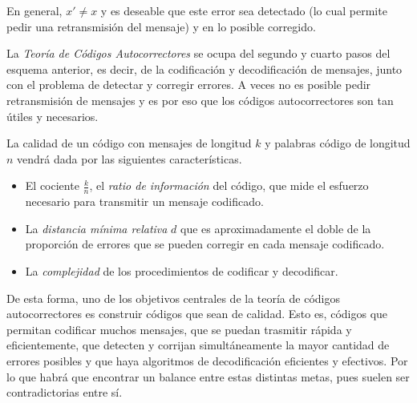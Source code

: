 En general, $x' \neq x$ y es deseable que este error sea detectado (lo cual permite pedir una retransmisión del mensaje) y en lo posible corregido.

La \emph{Teoría de Códigos Autocorrectores} se ocupa del segundo y cuarto pasos del esquema anterior, es decir, de la codificación y decodificación de mensajes, junto con el problema de detectar y corregir errores. A veces no es posible pedir retransmisión de mensajes y es por eso que los códigos autocorrectores son tan útiles y necesarios.

La calidad de un código con mensajes de longitud $k$ y palabras código de longitud $n$ vendrá dada por las siguientes características.

\begin{itemize}
    \item El cociente $\frac{k}{n}$, el \emph{ratio de información} del código, que mide el esfuerzo necesario para transmitir un mensaje codificado.
    \item La \emph{distancia mínima relativa} $d$ que es aproximadamente el doble de la proporción de errores que se pueden corregir en cada mensaje codificado.
    \item La \emph{complejidad} de los procedimientos de codificar y decodificar.
\end{itemize}

De esta forma, uno de los objetivos centrales de la teoría de códigos autocorrectores es construir códigos que sean de calidad. Esto es, códigos que permitan codificar muchos mensajes, que se puedan trasmitir rápida y eficientemente, que detecten y corrijan simultáneamente la mayor cantidad de errores posibles y que haya algoritmos de decodificación eficientes y efectivos. Por lo que habrá que encontrar un balance entre estas distintas metas, pues suelen ser contradictorias entre sí.
